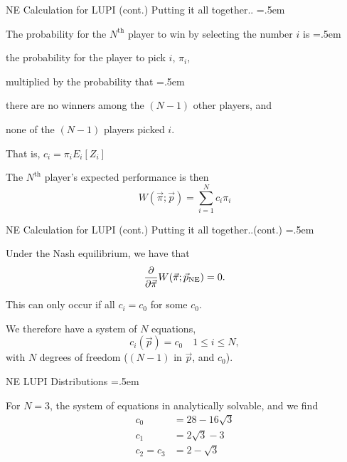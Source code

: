 \documentclass[xcolor={dvipsnames}]{beamer}
\let\olditemize=\itemize
\let\endolditemize=\enditemize
\renewenvironment{itemize}{\olditemize \itemsep=.5em }{\endolditemize}
\begin{document}
\begin{frame}{NE Calculation for LUPI (cont.)}
\alert{Putting it all together..}
\begin{itemize}
    \item<1-> The probability for the $N^\text{th}$ player to win by selecting the number $i$ is
    \begin{itemize}
        \item<2-> the probability for the player to pick $i$, $\pi_i$,
        \item<3-> multiplied by the probability that 
        \begin{itemize}
            \item<4-> there are no winners among the $(N-1)$ other players, and
            \item<5-> none of the $(N-1)$ players picked $i$. 
        \end{itemize}
    \end{itemize}
    \item<6-> That is, $c_i = \pi_iE_i[Z_i]$
    \item<7-> The $N^\text{th}$ player's expected performance is then
    \[ W(\vec{\pi}; \vec{p}) = \sum_{i=1}^N c_i\pi_i \]
\end{itemize}
\end{frame}

\begin{frame}{NE Calculation for LUPI (cont.)}
\alert{Putting it all together..(cont.)}
\begin{itemize}
    \item<1-> Under the Nash equilibrium, we have that
    \[ \pdv{\vec{\pi}}W(\vec{\pi}; \vec{p}_\text{NE}) = 0. \]
    \item<2-> This can only occur if all $c_i = c_0$ for some $c_0$.
    \item<3-> We therefore have a system of $N$ equations,
    \[ c_i(\vec{p}) = c_0 \quad 1 \leq i \leq N, \]
    with $N$ degrees of freedom ($(N-1)$ in $\vec{p}$, and $c_0$).
\end{itemize}
\end{frame}

\begin{frame}{NE LUPI Distributions}
\begin{itemize}
    \item<1-> For $N=3$, the system of equations in analytically solvable, and we find
    \begin{align*}
        c_0 &= 28 - 16\sqrt{3} \\
        c_1 &= 2\sqrt{3} - 3 \\
        c_2 = c_3 &= 2 - \sqrt{3}
    \end{align*}
\end{itemize}
\end{frame}
\end{document}
